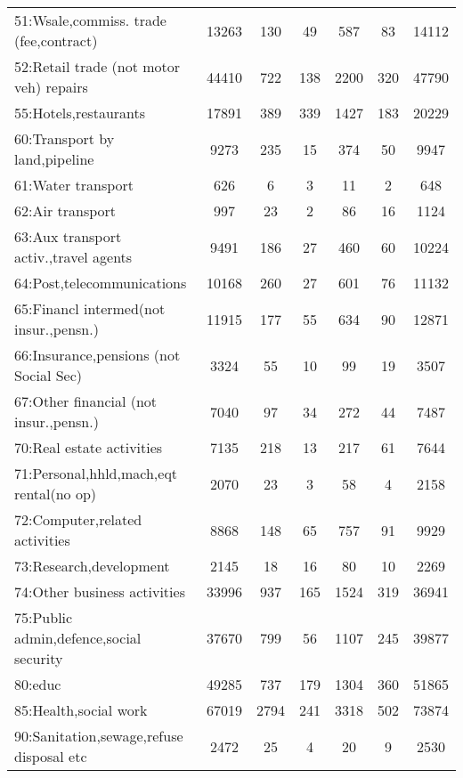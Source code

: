 {\begin{longtable}{l*{6}{c}}
51:Wsale,commiss. trade (fee,contract)&    13263&      130&       49&      587&       83&    14112\\
52:Retail trade (not motor veh) repairs&    44410&      722&      138&     2200&      320&    47790\\
55:Hotels,restaurants&    17891&      389&      339&     1427&      183&    20229\\
60:Transport by land,pipeline&     9273&      235&       15&      374&       50&     9947\\
61:Water transport&      626&        6&        3&       11&        2&      648\\
62:Air transport&      997&       23&        2&       86&       16&     1124\\
63:Aux transport activ.,travel agents&     9491&      186&       27&      460&       60&    10224\\
64:Post,telecommunications&    10168&      260&       27&      601&       76&    11132\\
65:Financl intermed(not insur.,pensn.)&    11915&      177&       55&      634&       90&    12871\\
66:Insurance,pensions (not Social Sec)&     3324&       55&       10&       99&       19&     3507\\
67:Other financial (not insur.,pensn.)&     7040&       97&       34&      272&       44&     7487\\
70:Real estate activities&     7135&      218&       13&      217&       61&     7644\\
71:Personal,hhld,mach,eqt rental(no op)&     2070&       23&        3&       58&        4&     2158\\
72:Computer,related activities&     8868&      148&       65&      757&       91&     9929\\
73:Research,development&     2145&       18&       16&       80&       10&     2269\\
74:Other business activities&    33996&      937&      165&     1524&      319&    36941\\
75:Public admin,defence,social security&    37670&      799&       56&     1107&      245&    39877\\
80:educ   &    49285&      737&      179&     1304&      360&    51865\\
85:Health,social work&    67019&     2794&      241&     3318&      502&    73874\\
90:Sanitation,sewage,refuse disposal etc&     2472&       25&        4&       20&        9&     2530\\

\end{longtable}}
